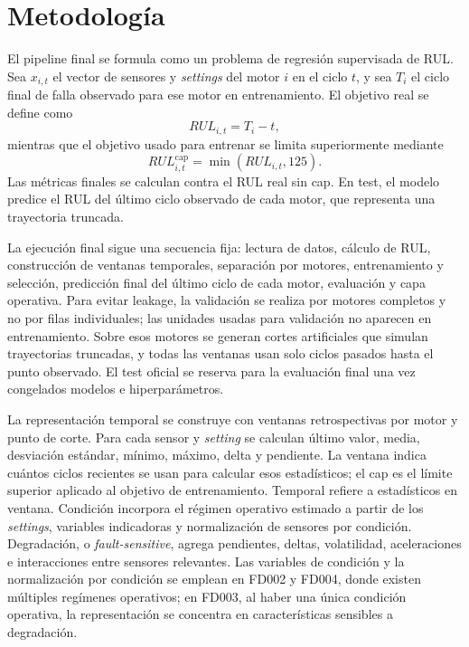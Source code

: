 \documentclass[conference, a4paper]{IEEEtran}
\begin{document}
\section{Metodología}
El pipeline final se formula como un problema de regresión supervisada de RUL. Sea $x_{i,t}$ el vector de sensores y \textit{settings} del motor $i$ en el ciclo $t$, y sea $T_i$ el ciclo final de falla observado para ese motor en entrenamiento. El objetivo real se define como
\begin{equation}
RUL_{i,t}=T_i-t,
\end{equation}
mientras que el objetivo usado para entrenar se limita superiormente mediante
\begin{equation}
RUL^{\mathrm{cap}}_{i,t} = \min(RUL_{i,t}, 125).
\end{equation}
Las métricas finales se calculan contra el RUL real sin cap. En test, el modelo predice el RUL del último ciclo observado de cada motor, que representa una trayectoria truncada.

La ejecución final sigue una secuencia fija: lectura de datos, cálculo de RUL, construcción de ventanas temporales, separación por motores, entrenamiento y selección, predicción final del último ciclo de cada motor, evaluación y capa operativa. Para evitar leakage, la validación se realiza por motores completos y no por filas individuales; las unidades usadas para validación no aparecen en entrenamiento. Sobre esos motores se generan cortes artificiales que simulan trayectorias truncadas, y todas las ventanas usan solo ciclos pasados hasta el punto observado. El test oficial se reserva para la evaluación final una vez congelados modelos e hiperparámetros.

La representación temporal se construye con ventanas retrospectivas por motor y punto de corte. Para cada sensor y \textit{setting} se calculan último valor, media, desviación estándar, mínimo, máximo, delta y pendiente. La ventana indica cuántos ciclos recientes se usan para calcular esos estadísticos; el cap es el límite superior aplicado al objetivo de entrenamiento. Temporal refiere a estadísticos en ventana. Condición incorpora el régimen operativo estimado a partir de los \textit{settings}, variables indicadoras y normalización de sensores por condición. Degradación, o \textit{fault-sensitive}, agrega pendientes, deltas, volatilidad, aceleraciones e interacciones entre sensores relevantes. Las variables de condición y la normalización por condición se emplean en FD002 y FD004, donde existen múltiples regímenes operativos; en FD003, al haber una única condición operativa, la representación se concentra en características sensibles a degradación.
\end{document}
